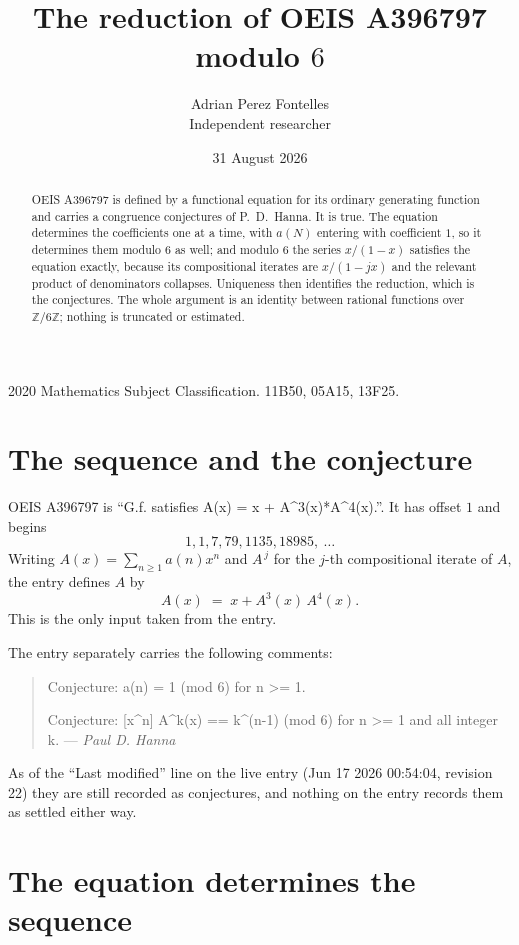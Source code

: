 \documentclass[11pt,a4paper]{article}
\title{The reduction of OEIS A396797 modulo $6$}
\author{Adrian Perez Fontelles\\ \small Independent researcher}
\date{31 August 2026}
\theoremstyle{plain}
\theoremstyle{definition}
\begin{document}
\maketitle

\begin{abstract}
OEIS A396797 is defined by a functional equation for its ordinary generating function and
carries a congruence conjectures of P.~D.~Hanna. It is true. The equation determines the
coefficients one at a time, with $a(N)$ entering with coefficient $1$, so it determines
them modulo $6$ as well; and modulo $6$ the series $x/(1-x)$ satisfies the equation
exactly, because its compositional iterates are $x/(1-jx)$ and the relevant product of
denominators collapses. Uniqueness then identifies the reduction, which is the conjectures.
The whole argument is an identity between rational functions over
$\mathbb{Z}/6\mathbb{Z}$; nothing is truncated or estimated.
\end{abstract}

\noindent\small 2020 Mathematics Subject Classification. 11B50, 05A15, 13F25.\normalsize

\section{The sequence and the conjecture}

OEIS A396797 is ``G.f. satisfies A(x) = x + A\^{}3(x)*A\^{}4(x).''. It has offset $1$ and begins
\[
1, 1, 7, 79, 1135, 18985,\ \dots
\]
Writing $A(x)=\sum_{n\ge1}a(n)x^{n}$ and $A^{\,j}$ for the $j$-th compositional
iterate of $A$, the entry defines $A$ by
\begin{equation}\label{eq:fe}
A(x)\;=\;x+A^{3}(x)\,A^{4}(x) .
\end{equation}
This is the only input taken from the entry.

The entry separately carries the following comments:
\begin{quote}\small
Conjecture: a(n) = 1 (mod 6) for n >= 1.

Conjecture: [x\^{}n] A\^{}k(x) == k\^{}(n-1) (mod 6) for n >= 1 and all integer k. --- \emph{Paul D. Hanna}
\end{quote}
As of the ``Last modified'' line on the live entry (Jun 17 2026 00:54:04, revision 22) they are
still recorded as conjectures, and nothing on the entry records
them as settled either way. 

\section{The equation determines the sequence}
\end{document}
